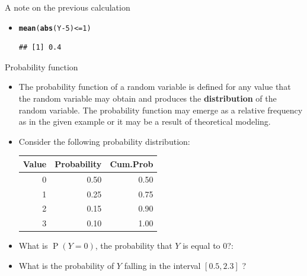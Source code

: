\documentclass[10pt,handout]{beamer}\usepackage[]{graphicx}\usepackage[]{color}
\makeatletter
\newcommand{\hlnum}[1]{\textcolor[rgb]{0.686,0.059,0.569}{#1}}%
\newcommand{\hlopt}[1]{\textcolor[rgb]{0,0,0}{#1}}%
\newcommand{\hlstd}[1]{\textcolor[rgb]{0.345,0.345,0.345}{#1}}%
\newcommand{\hlkwd}[1]{\textcolor[rgb]{0.737,0.353,0.396}{\textbf{#1}}}%
\newenvironment{kframe}{%
 \def\at@end@of@kframe{}%
 \ifinner\ifhmode%
  \def\at@end@of@kframe{\end{minipage}}%
  \begin{minipage}{\columnwidth}%
 \fi\fi%
 \def\FrameCommand##1{\hskip\@totalleftmargin \hskip-\fboxsep
 \colorbox{shadecolor}{##1}\hskip-\fboxsep
     \hskip-\linewidth \hskip-\@totalleftmargin \hskip\columnwidth}%
 \MakeFramed {\advance\hsize-\width
   \@totalleftmargin\z@ \linewidth\hsize
   \@setminipage}}%
 {\par\unskip\endMakeFramed%
 \at@end@of@kframe}
\newenvironment{knitrout}{}{} %
\newcommand{\Prob}{\operatorname{P}}
\makeatother
\begin{document}
\begin{frame}[fragile]{A note on the previous calculation}
\begin{itemize}[<+->]
\item 		
\begin{knitrout}
\color{fgcolor}\begin{kframe}
\begin{alltt}
\hlkwd{mean}\hlstd{(}\hlkwd{abs}\hlstd{(Y} \hlopt{-} \hlnum{5}\hlstd{)} \hlopt{<=} \hlnum{1}\hlstd{)}
\end{alltt}
\begin{verbatim}
## [1] 0.4
\end{verbatim}
\end{kframe}
\end{knitrout}
		
	\end{itemize}
	
\end{frame}




\begin{frame}[fragile]{Probability function}
	\small
	\begin{itemize}[<+->]
		
		\item The probability function of a random variable is defined for any value
		that the random variable may obtain and produces the \textbf{distribution} of
		the random variable. The probability function may emerge as a relative
		frequency as in the given example or it may be a result of theoretical
		modeling.
		
		\item Consider the following probability distribution:
		
\begin{knitrout}\small
{}\color{fgcolor}
\begin{tabular}{rrr}
\toprule
Value & Probability & Cum.Prob\\
\midrule
0 & 0.50 & 0.50\\
1 & 0.25 & 0.75\\
2 & 0.15 & 0.90\\
3 & 0.10 & 1.00\\
\bottomrule
\end{tabular}

\end{knitrout}
		
		\item What is $\Prob(Y=0)$, the probability that $Y$ is equal to 0?:
		
		\item What is the probability of $Y$ falling in the interval $[0.5, 2.3]$ ?
		
		
	\end{itemize}
	
\end{frame}
\end{document}
